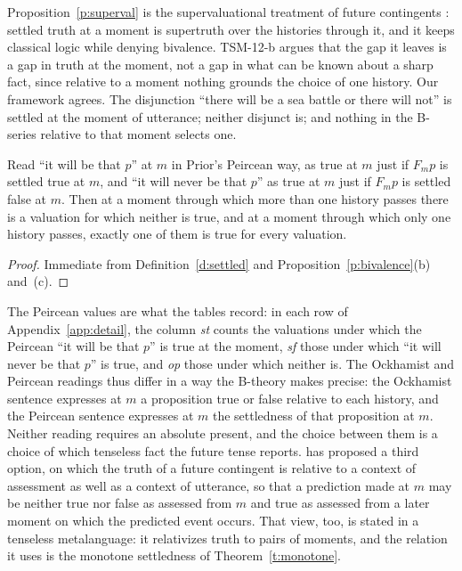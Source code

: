 \documentclass{situationist-preprint}
\begin{document}
Proposition~\ref{p:superval} is the supervaluational treatment of future contingents \citep{Thomason1970}: settled truth at a moment is supertruth over the histories through it, and it keeps classical logic while denying bivalence. TSM-12-b argues that the gap it leaves is a gap in truth at the moment, not a gap in what can be known about a sharp fact, since relative to a moment nothing grounds the choice of one history. Our framework agrees. The disjunction \enquote{there will be a sea battle or there will not} is settled at the moment of utterance; neither disjunct is; and nothing in the B-series relative to that moment selects one.

\begin{proposition}\label{p:peirce}
Read \enquote{it will be that $p$} at $m$ in Prior's Peircean way, as true at $m$ just if $F_m p$ is settled true at $m$, and \enquote{it will never be that $p$} as true at $m$ just if $F_m p$ is settled false at $m$. Then at a moment through which more than one history passes there is a valuation for which neither is true, and at a moment through which only one history passes, exactly one of them is true for every valuation.
\end{proposition}

\begin{proof}
Immediate from Definition~\ref{d:settled} and Proposition~\ref{p:bivalence}(b) and~(c).
\end{proof}

The Peircean values are what the tables record: in each row of Appendix~\ref{app:detail}, the column \emph{st} counts the valuations under which the Peircean \enquote{it will be that $p$} is true at the moment, \emph{sf} those under which \enquote{it will never be that $p$} is true, and \emph{op} those under which neither is. The Ockhamist and Peircean readings thus differ in a way the B-theory makes precise: the Ockhamist sentence expresses at $m$ a proposition true or false relative to each history, and the Peircean sentence expresses at $m$ the settledness of that proposition at $m$. Neither reading requires an absolute present, and the choice between them is a choice of which tenseless fact the future tense reports. \citet{MacFarlane2003} has proposed a third option, on which the truth of a future contingent is relative to a context of assessment as well as a context of utterance, so that a prediction made at $m$ may be neither true nor false as assessed from $m$ and true as assessed from a later moment on which the predicted event occurs. That view, too, is stated in a tenseless metalanguage: it relativizes truth to pairs of moments, and the relation it uses is the monotone settledness of Theorem~\ref{t:monotone}.
\end{document}
